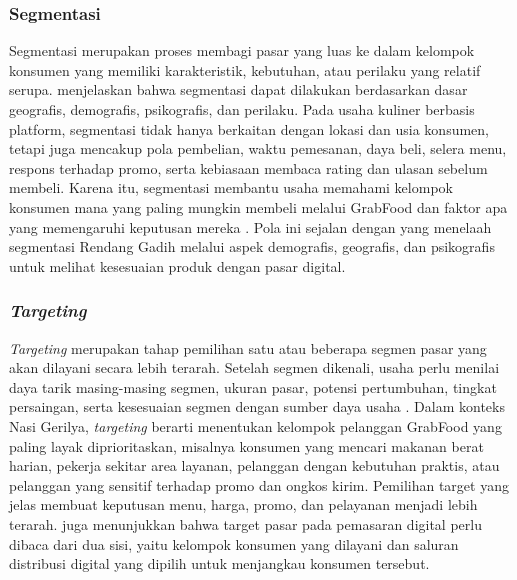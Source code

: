 \subsubsection{Segmentasi}
Segmentasi merupakan proses membagi pasar yang luas ke dalam kelompok konsumen yang memiliki karakteristik, kebutuhan, atau perilaku yang relatif serupa. \textcite{kotler2023principlesmarketing} menjelaskan bahwa segmentasi dapat dilakukan berdasarkan dasar geografis, demografis, psikografis, dan perilaku. Pada usaha kuliner berbasis platform, segmentasi tidak hanya berkaitan dengan lokasi dan usia konsumen, tetapi juga mencakup pola pembelian, waktu pemesanan, daya beli, selera menu, respons terhadap promo, serta kebiasaan membaca rating dan ulasan sebelum membeli. Karena itu, segmentasi membantu usaha memahami kelompok konsumen mana yang paling mungkin membeli melalui GrabFood dan faktor apa yang memengaruhi keputusan mereka \parencite{kotler2021marketingmanagement,chaffey2022digitalmarketing}. Pola ini sejalan dengan \textcite{sophia2025rendanggadih} yang menelaah segmentasi Rendang Gadih melalui aspek demografis, geografis, dan psikografis untuk melihat kesesuaian produk dengan pasar digital.

\subsubsection{\textit{Targeting}}
\textit{Targeting} merupakan tahap pemilihan satu atau beberapa segmen pasar yang akan dilayani secara lebih terarah. Setelah segmen dikenali, usaha perlu menilai daya tarik masing-masing segmen, ukuran pasar, potensi pertumbuhan, tingkat persaingan, serta kesesuaian segmen dengan sumber daya usaha \parencite{kotler2023principlesmarketing}. Dalam konteks Nasi Gerilya, \textit{targeting} berarti menentukan kelompok pelanggan GrabFood yang paling layak diprioritaskan, misalnya konsumen yang mencari makanan berat harian, pekerja sekitar area layanan, pelanggan dengan kebutuhan praktis, atau pelanggan yang sensitif terhadap promo dan ongkos kirim. Pemilihan target yang jelas membuat keputusan menu, harga, promo, dan pelayanan menjadi lebih terarah. \textcite{sophia2025rendanggadih} juga menunjukkan bahwa target pasar pada pemasaran digital perlu dibaca dari dua sisi, yaitu kelompok konsumen yang dilayani dan saluran distribusi digital yang dipilih untuk menjangkau konsumen tersebut.

